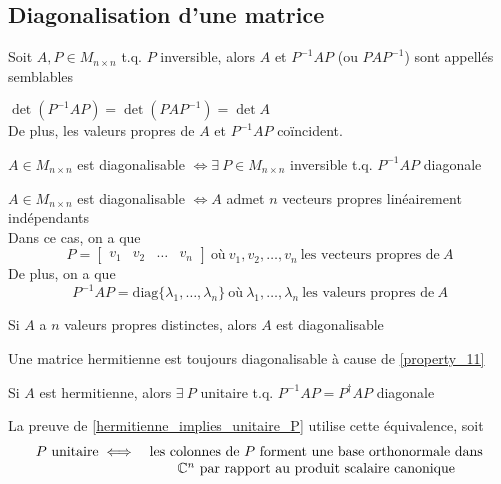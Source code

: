 \subsection{Diagonalisation d'une matrice}
\begin{definition}
    Soit $A, P \in M_{n \times n}$ t.q. $P$ inversible, alors $A$ et $P^{-1}AP$ (ou $PAP^{-1}$) sont appellés semblables
\end{definition}
\begin{remark}
    $\det(P^{-1}AP) = \det(PAP^{-1}) = \det A$ \\
    De plus, les valeurs propres de $A$ et $P^{-1}AP$ coïncident.
\end{remark}
\begin{definition}
    $A \in M_{n \times n}$ est diagonalisable $\iff \exists \ P \in M_{n \times n}$ inversible t.q. $P^{-1}AP$ diagonale
\end{definition}
\begin{theorem}
    $A \in M_{n \times n}$ est diagonalisable $\iff A$ admet $n$ vecteurs propres linéairement indépendants \\
    Dans ce cas, on a que \[P = \begin{bmatrix}
            v_1 & v_2 & \dots & v_n
        \end{bmatrix} \ \text{où} \ v_1, v_2, \dots, v_n \ \text{les vecteurs propres de} \ A\] 
        De plus, on a que
        \[P^{-1}AP = \text{diag}\{\lambda_1, \dots, \lambda_n\} \ \text{où} \ \lambda_1, \dots, \lambda_n 
        \ \text{les valeurs propres de} \ A\] 
\end{theorem}
\begin{corollary}
    Si $A$ a $n$ valeurs propres distinctes, alors $A$ est diagonalisable
\end{corollary}
\begin{corollary}
    Une matrice hermitienne est toujours diagonalisable à cause de \ref{property_11}
\end{corollary}
\begin{corollary}
    \label{hermitienne_implies_unitaire_P}
    Si $A$ est hermitienne, alors $\exists \ P$ unitaire t.q. $P^{-1}AP = P^\dagger A P$ diagonale
\end{corollary}
\begin{remark}
    La preuve de \ref{hermitienne_implies_unitaire_P} utilise cette équivalence, soit
    \[
        \begin{matrix}
            P \ \text{unitaire} \iff & \text{les colonnes de} \ P \ \text{forment une base orthonormale dans} \\
                                     & \C^n \ \text{par rapport au produit scalaire canonique}
        \end{matrix}
    \]
\end{remark}

